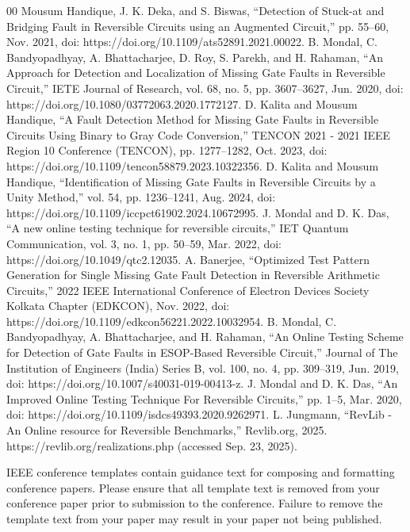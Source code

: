 \documentclass[conference]{IEEEtran}
\begin{document}
\begin{thebibliography}{00}
Mousum Handique, J. K. Deka, and S. Biswas, “Detection of Stuck-at and Bridging Fault in Reversible Circuits using an Augmented Circuit,” pp. 55–60, Nov. 2021, doi: https://doi.org/10.1109/ats52891.2021.00022.
B. Mondal, C. Bandyopadhyay, A. Bhattacharjee, D. Roy, S. Parekh, and H. Rahaman, “An Approach for Detection and Localization of Missing Gate Faults in Reversible Circuit,” IETE Journal of Research, vol. 68, no. 5, pp. 3607–3627, Jun. 2020, doi: https://doi.org/10.1080/03772063.2020.1772127.
D. Kalita and Mousum Handique, “A Fault Detection Method for Missing Gate Faults in Reversible Circuits Using Binary to Gray Code Conversion,” TENCON 2021 - 2021 IEEE Region 10 Conference (TENCON), pp. 1277–1282, Oct. 2023, doi: https://doi.org/10.1109/tencon58879.2023.10322356.
D. Kalita and Mousum Handique, “Identification of Missing Gate Faults in Reversible Circuits by a Unity Method,” vol. 54, pp. 1236–1241, Aug. 2024, doi: https://doi.org/10.1109/iccpct61902.2024.10672995.
‌J. Mondal and D. K. Das, “A new online testing technique for reversible circuits,” IET Quantum Communication, vol. 3, no. 1, pp. 50–59, Mar. 2022, doi: https://doi.org/10.1049/qtc2.12035.‌
A. Banerjee, “Optimized Test Pattern Generation for Single Missing Gate Fault Detection in Reversible Arithmetic Circuits,” 2022 IEEE International Conference of Electron Devices Society Kolkata Chapter (EDKCON), Nov. 2022, doi: https://doi.org/10.1109/edkcon56221.2022.10032954.
B. Mondal, C. Bandyopadhyay, A. Bhattacharjee, and H. Rahaman, “An Online Testing Scheme for Detection of Gate Faults in ESOP-Based Reversible Circuit,” Journal of The Institution of Engineers (India) Series B, vol. 100, no. 4, pp. 309–319, Jun. 2019, doi: https://doi.org/10.1007/s40031-019-00413-z.
J. Mondal and D. K. Das, “An Improved Online Testing Technique For Reversible Circuits,” pp. 1–5, Mar. 2020, doi: https://doi.org/10.1109/isdcs49393.2020.9262971.
L. Jungmann, “RevLib - An Online resource for Reversible Benchmarks,” Revlib.org, 2025. https://revlib.org/realizations.php (accessed Sep. 23, 2025).
\end{thebibliography}

\vspace{12pt}
\color{red}
IEEE conference templates contain guidance text for composing and formatting conference papers. Please ensure that all template text is removed from your conference paper prior to submission to the conference. Failure to remove the template text from your paper may result in your paper not being published.
\end{document}
